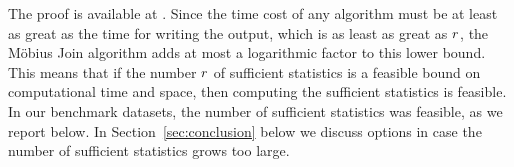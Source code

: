\documentclass{sig-alternate-2013}
\newcommand{\ct}{\mathit{ct}}
\begin{document}
The proof is available at \cite{Qian2014}.
Since the time cost of any algorithm must be at least as great as the time for writing the output, which is as least as great as $r$, 
the M\"obius Join algorithm adds at most a logarithmic factor to this lower bound. 
This means that
if the number $r$ of sufficient statistics is a feasible bound on computational time and space, then computing the sufficient statistics is feasible. In our benchmark datasets, the number of sufficient statistics was feasible, as we report below. 
In Section~\ref{sec:conclusion} below we discuss options in case the number of sufficient statistics  grows too large.
%
%
\end{document}
